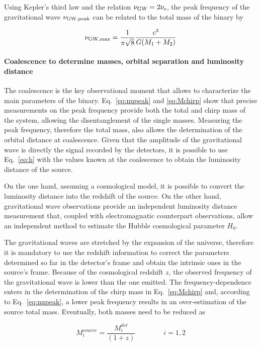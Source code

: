 \documentclass[a4paper,titlepage]{book}     	%
\begin{document}
Using Kepler's third law and the relation $\nu_{\rm GW} = 2 \nu_{\rm s}$, the peak frequency of the gravitational wave $\nu_{\rm GW, peak}$ can be related to the total mass of the binary by


\begin{equation}\label{eq:nupeak}
	\nu_{\rm GW, max} = \frac{1}{\pi \sqrt{8}}\frac{c^3}{G(M_1+M_2)}
\end{equation}




\paragraph{Coalescence to determine masses, orbital separation and luminosity distance} The coalescence is the key observational moment that allows to characterize the main parameters of the binary. Eq.\ \ref{eq:nupeak} and \ref{eq:Mchirp} show that precise measurements on the peak frequency provide both the total and chirp mass of the system, allowing the disentanglement of the single masses. Measuring the peak frequency, therefore the total mass, also allows the determination of the orbital distance at coalescence. Given that the amplitude of the gravitational wave is directly the signal recorded by the detectors, it is possible to use Eq.\ \ref{eq:h} with the values known at the coalescence to obtain the luminosity distance of the source.


On the one hand, assuming a cosmological model, it is possible to convert the luminosity distance into the redshift of the source. On the other hand, gravitational wave observations provide an independent luminosity distance measurement that, coupled with electromagnatic counterpart observations, allow an independent method to estimate the Hubble cosmological parameter $H_0$. \cite{H0fromGW}

The gravitational waves are stretched by the expansion of the universe, therefore it is mandatory to use the redshift information to correct the parameters determined so far in the detector's frame and obtain the intrinsic ones in the source's frame. Because of the cosmological redshift $z$, the observed frequency of the gravitational wave is lower than the one emitted. The frequency-dependence enters in the determination of the chirp mass in Eq.\ \ref{eq:Mchirp} and, according to Eq.\ \ref{eq:nupeak}, a lower peak frequency results in an over-estimation of the source total mass. Eventually, both masses need to be reduced as

\begin{equation}\label{eq:Massesredshift}
	M_i^{source} = \frac{M_i^{det}}{(1+z)} \qquad \qquad i=1,2
\end{equation}
\end{document}
